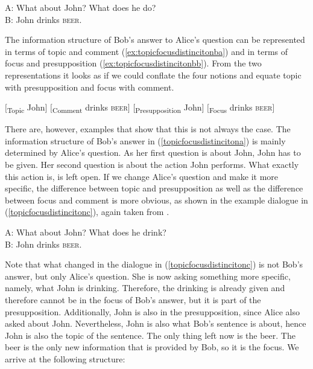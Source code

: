 \begin{exe}
\ex\label{topicfocusdistincitona}
A: What about John? What does he do? \\
B: John drinks \textsc{beer}.
\end{exe}

\noindent The information structure of Bob's answer to Alice's question can be represented in terms of topic and comment (\ref{ex:topicfocusdistincitonba}) and in terms of focus and presupposition (\ref{ex:topicfocusdistincitonbb}). From the two representations it looks as if we could conflate the four notions and equate topic with presupposition and focus with comment.

\begin{exe}
\ex\label{topicfocusdistincitonb}\begin{xlist} 
\ex $[$\textsubscript{Topic} John$]$ $[$\textsubscript{Comment} drinks \textsc{beer}$]$ \label{ex:topicfocusdistincitonba}
\ex $[$\textsubscript{Presupposition} John$]$ $[$\textsubscript{Focus} drinks \textsc{beer}$]$ \label{ex:topicfocusdistincitonbb}
\end{xlist}
\end{exe}

\noindent There are, however, examples that show that this is not always the case. The information structure of Bob's answer in (\ref{topicfocusdistincitona}) is mainly determined by Alice's question. As her first question is about John, John has to be given. Her second question is about the action John performs. What exactly this action is, is left open. If we change Alice's question and make it more specific, the difference between topic and presupposition as well as the difference between focus and comment is more obvious, as shown in the example dialogue in (\ref{topicfocusdistincitonc}), again taken from \citet[468]{vallduvi1996linguistic}.

\begin{exe}
\ex\label{topicfocusdistincitonc}
A: What about John? What does he drink? \\
B: John drinks \textsc{beer}.
\end{exe}

\noindent Note that what changed in the dialogue in (\ref{topicfocusdistincitonc}) is not Bob's answer, but only Alice's question. She is now asking something more specific, namely, what John is drinking. Therefore, the drinking is already given and therefore cannot be in the focus of Bob's answer, but it is part of the presupposition. Additionally, John is also in the presupposition, since Alice also asked about John. Nevertheless, John is also what Bob's sentence is about, hence John is also the topic of the sentence. The only thing left now is the beer. The beer is the only new information that is provided by Bob, so it is the focus. We arrive at the following structure:

